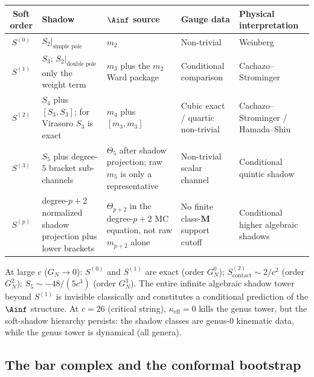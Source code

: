 \begin{center}
\renewcommand{\arraystretch}{1.2}
\begin{tabular}{cllll}
\textbf{Soft order} &
\textbf{Shadow} &
\textbf{$\Ainf$ source} &
\textbf{Gauge data} &
\textbf{Physical interpretation} \\
\hline
$S^{(0)}$ & $S_2|_{\text{simple pole}}$ & $m_2$ &
 Non-trivial & Weinberg \\[2pt]
$S^{(1)}$ & $S_3$; $S_2|_{\text{double pole}}$ only the weight term &
 $m_3$ plus the $m_2$ Ward package &
 Conditional comparison & Cachazo--Strominger \\[2pt]
$S^{(2)}$ & \(S_4\) plus \([S_3,S_3]\); for Virasoro \(S_3\) is exact &
 \(m_4\) plus \([m_3,m_3]\) &
 Cubic exact / quartic non-trivial & Cachazo--Strominger / Hamada--Shiu \\[2pt]
$S^{(3)}$ & \(S_5\) plus degree-$5$ bracket sub-channels &
 \(\Theta_5\) after shadow projection; raw \(m_5\) is only a
 representative &
 Non-trivial scalar channel & Conditional quintic shadow \\[2pt]
$S^{(p)}$ & degree-\(p+2\) normalized shadow projection plus lower brackets &
 \(\Theta_{p+2}\) in the degree-\(p+2\) MC equation, not raw
 \(m_{p+2}\) alone &
 No finite class-\(\mathbf M\) support cutoff &
 Conditional higher algebraic shadows
\end{tabular}
\end{center}

\begin{remark}
At large $c$ ($G_N \to 0$): $S^{(0)}$ and $S^{(1)}$ are exact
(order $G_N^0$); $S^{(2)}_{\text{contact}} \sim 2/c^2$
(order $G_N^2$); $S_5 \sim -48/(5c^3)$
(order $G_N^3$).
The entire infinite algebraic shadow tower beyond $S^{(1)}$ is invisible
classically and constitutes a conditional prediction of the
$\Ainf$ structure. At $c = 26$ (critical string),
$\kappa_{\mathrm{eff}} = 0$ kills the genus tower, but the
soft-shadow hierarchy persists: the shadow classes are genus-$0$
kinematic data, while the genus tower is dynamical (all genera).
\end{remark}


\subsection{The bar complex and the conformal bootstrap}
\label{subsec:bar-bootstrap}

